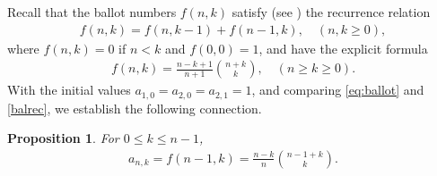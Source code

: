 \documentclass[12pt,reqno]{amsart}
\numberwithin{equation}{section}
\theoremstyle{plain}
\newtheorem{proposition}[theorem]{Proposition}
\theoremstyle{definition}
\begin{document}
Recall that the  ballot numbers $f(n,k)$ satisfy  (see \cite{Aig08, CZ15}) the recurrence relation
\begin{align}\label{eq:ballot}
f(n,k)=f(n,k-1)+f(n-1, k),\quad (n,k\geq 0),
\end{align}
where $f(n,k)=0$ if $n<k$ and $f(0,0)=1$, and have the explicit formula
\begin{align*}
f(n,k)=\frac{n-k+1}{n+1}\binom{n+k}{k},\quad (n\geq k\geq 0).
\end{align*}
With the initial values $a_{1, 0}=a_{2, 0}=a_{2, 1}=1$, and comparing \eqref{eq:ballot} and \eqref{balrec}, we establish the following connection.
\begin{proposition}
For $0\leq k\leq n-1$,
\begin{align*}
a_{n, k}=f(n-1,k)=\frac{n-k}{n}\binom{n-1+k}{k}.
\end{align*}
\end{proposition}
\end{document}
